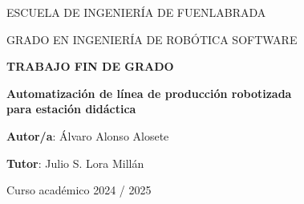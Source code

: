\thispagestyle{empty}
\vspace{2cm}

\begin{figure}[htb]
  \centerline{}
\end{figure}

\begin{center}
  \vspace{5mm}
    {\Large {ESCUELA DE INGENIERÍA DE FUENLABRADA}}
  \vspace{1cm}
  
  {\Large {GRADO EN INGENIERÍA DE ROBÓTICA SOFTWARE}}
  \vspace{20mm}

   {\Large {\textbf{TRABAJO FIN DE GRADO}}}


   \vspace{2cm}

  {\large \textbf{Automatización de línea de producción robotizada  \\
              para estación didáctica }}

  \vspace{2cm}
  
  {\bf Autor/a}: Álvaro Alonso Alosete
  
  {\bf Tutor}: Julio S. Lora Millán 

\vspace{3cm}

  Curso académico 2024 / 2025

 
\end{center}

\clearpage
\thispagestyle{empty}
